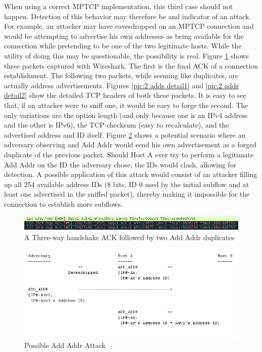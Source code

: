 When using a correct MPTCP implementation, this third case should not happen. Detection of this behavior may therefore be and indicator of an attack. For example, an attacker may have eavesdropped on an MPTCP connection and would be attempting to advertise his own addresses as being available for the connection while pretending to be one of the two legitimate hosts. While the utility of doing this may be questionable, the possibility is real. Figure \ref{pic:2 adds} shows three packets captured with Wireshark. The first is the final ACK of a connection establishment. The following two packets, while seeming like duplicates, are actually address advertisements. Figures \ref{pic:2 adds detail1} and \ref{pic:2 adds detail2} show the detailed TCP headers of both these packets. It is easy to see that, if an attacker were to sniff one, it would be easy to forge the second. The only variations are the option length (and only because one is an IPv4 address and the other is IPv6), the TCP checksum (easy to recalculate), and the advertised address and ID itself.  Figure \ref{pic:2 add attack} shows a potential scenario where an adversary observing and Add Addr would send his own advertisement as a forged duplicate of the previous packet. Should Host A ever try to perform a legitimate Add Addr on the ID the adversary chose, the IDs would clash, allowing for detection. A possible application of this attack  would consist of an attacker filling up all 254 available address IDs (8 bits, ID 0 used by the initial subflow and at least one advertised in the sniffed packet), thereby making it impossible for the connection to establish more subflows.\\

\begin{figure}[!t]
\centering
\includegraphics[scale = 0.6]{Figures/2addaddrwireshark.png}
\caption{A Three-way handshake ACK followed by two Add Addr duplicates}
\label{pic:2 adds}
\end{figure}

\begin{figure}[!t]
\centering
\includegraphics[scale = 0.6]{Figures/addaddrattack.png}
\caption{Possible Add Addr Attack}
\label{pic:2 add attack}
\end{figure}

